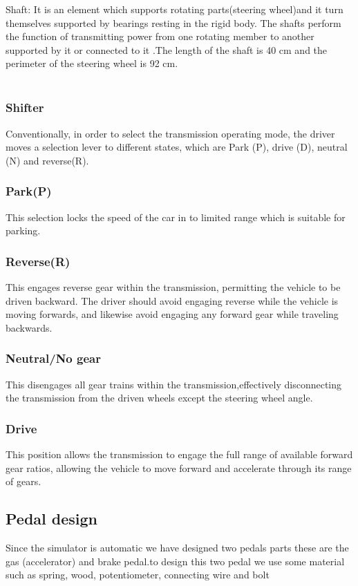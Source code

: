 \documentclass[12pt,a4paper]{article}
\begin{document}
\begin{center}
\begin{center}
\begin{figure}[H]
\end{figure}
Shaft: It is an element which supports rotating parts(steering wheel)and it turn themselves supported by bearings resting in the rigid body. The shafts perform the function of transmitting power from one rotating member to another supported by it or connected to it .The length of the shaft is 40 cm  and the perimeter of the steering wheel is 92 cm.\\
\\
\subsubsection*{Shifter}
Conventionally, in order to select the transmission operating mode, the driver moves a selection lever to different states, which are Park (P), drive (D), neutral (N) and reverse(R).
\subsubsection*{Park(P)}
 This selection locks the speed of the car in to limited range which is suitable for parking. 
 \subsubsection*{Reverse(R)}
 This engages reverse gear within the transmission, permitting the vehicle to be driven backward. The driver should avoid engaging reverse while the vehicle is moving forwards, and likewise avoid engaging any forward gear while traveling backwards.
 \subsubsection*{Neutral/No gear}
This disengages all gear trains within the transmission,effectively disconnecting the transmission from the driven wheels except the steering wheel angle.
 \subsubsection*{Drive}
 This position allows the transmission to engage the full range of available forward gear ratios, allowing the vehicle to move forward and accelerate through its range of gears. 
  \subsection*{Pedal design }
  Since the simulator is automatic we have designed two pedals parts these are the gas (accelerator) and brake pedal.to design this two pedal we use some material such as spring, wood, potentiometer, connecting wire and bolt 

\end{center}
\end{center}
\end{document}
